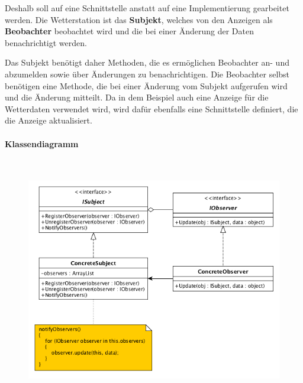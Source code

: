	Deshalb soll auf eine Schnittstelle anstatt auf eine Implementierung gearbeitet werden.
	Die Wetterstation ist das \textbf{Subjekt}, welches von den Anzeigen als \textbf{Beobachter} beobachtet wird und die bei einer Änderung der Daten benachrichtigt werden. 
	
	Das Subjekt benötigt daher Methoden, die es ermöglichen Beobachter an- und abzumelden sowie über Änderungen zu benachrichtigen. Die Beobachter selbst benötigen eine Methode, die bei einer Änderung vom Subjekt aufgerufen wird und die Änderung mitteilt. Da in dem Beispiel auch eine Anzeige für die Wetterdaten verwendet wird, wird dafür ebenfalls eine Schnittstelle definiert, die die Anzeige aktualisiert.
	
	\paragraph{Klassendiagramm \cite{new}}\mbox{}\\
	\begin{figure}[!h]
		\begin{center}
			\includegraphics[width=0.9\linewidth]{images/obs1.png}
		\end{center}
	\end{figure}


\clearpage


